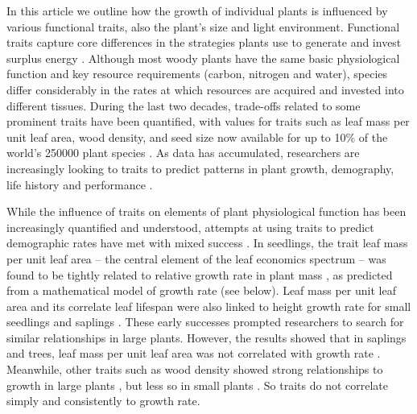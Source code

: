 \documentclass[a4paper,11pt]{article}
\begin{document}

In this article we outline how the growth of individual plants is influenced by various functional traits, also the plant's size and light environment. Functional traits capture core differences in the strategies plants use to generate and invest surplus energy \citep{Westoby-2002, Wright-2004, Chave-2009}. Although most woody plants have the same basic physiological function and key resource requirements (carbon, nitrogen and water), species differ considerably in the rates at which resources are acquired and invested into different tissues. During the last two decades, trade-offs related to some prominent traits have been quantified, with values for traits such as leaf mass per unit leaf area, wood density, and seed size now available for up to 10\% of the world's 250000 plant species \citep{Cornwell-2014}. As data has accumulated, researchers are increasingly looking to traits to predict patterns in plant growth, demography, life history and performance \citep{Poorter-2008, Wright-2010, VanKleunen-2010, Adler-2014}.

While the influence of traits on elements of plant physiological function has been increasingly quantified and understood, attempts at using traits to predict demographic rates have met with mixed success \citep{Poorter-2006, Poorter-2008,Wright-2010,Herault-2011,Paine-2015}. In seedlings, the trait leaf mass per unit leaf area -- the central element of the leaf economics spectrum \citep{Wright-2004} -- was found to be tightly related to relative growth rate in plant mass \citep{Lambers-1992, Cornelissen-1996, Wright-2000}, as predicted from a mathematical model of growth rate (see below). Leaf mass per unit leaf area and its correlate leaf lifespan were also linked to height growth rate for small seedlings and saplings \citep{Reich-1992, Poorter-2006}. These early successes prompted researchers to search for similar relationships in large plants. However, the results showed that in saplings and trees, leaf mass per unit leaf area was not correlated with growth rate \citep{Poorter-2008, Wright-2010, Herault-2011, Paine-2015}. Meanwhile, other traits such as wood density showed strong relationships to growth in large plants \citep{Wright-2010,Herault-2011}, but less so in small plants \citep{Castro-1998}. So traits do not correlate simply and consistently to growth rate.
\end{document}
